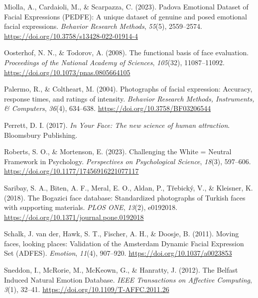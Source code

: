 \documentclass[
  letterpaper,
  DIV=11,
  numbers=noendperiod]{scrartcl}
\newlength{\cslhangindent}
\newenvironment{CSLReferences}[2] %
 {\begin{list}{}{%
  \setlength{\itemindent}{0pt}
  \setlength{\leftmargin}{0pt}
  \setlength{\parsep}{0pt}
  \ifodd #1
   \setlength{\leftmargin}{\cslhangindent}
   \setlength{\itemindent}{-1\cslhangindent}
  \fi
  \setlength{\itemsep}{#2\baselineskip}}}
 {\end{list}}
\begin{document}
\begin{CSLReferences}{1}{0}
Miolla, A., Cardaioli, M., \& Scarpazza, C. (2023). Padova {Emotional}
{Dataset} of {Facial} {Expressions} ({PEDFE}): {A} unique dataset of
genuine and posed emotional facial expressions. \emph{Behavior Research
Methods}, \emph{55}(5), 2559--2574.
\url{https://doi.org/10.3758/s13428-022-01914-4}

Oosterhof, N. N., \& Todorov, A. (2008). The functional basis of face
evaluation. \emph{Proceedings of the National Academy of Sciences},
\emph{105}(32), 11087--11092.
\url{https://doi.org/10.1073/pnas.0805664105}

Palermo, R., \& Coltheart, M. (2004). Photographs of facial expression:
{Accuracy}, response times, and ratings of intensity. \emph{Behavior
Research Methods, Instruments, \& Computers}, \emph{36}(4), 634--638.
\url{https://doi.org/10.3758/BF03206544}

Perrett, D. I. (2017). \emph{In {Your} {Face}: {The} new science of
human attraction}. Bloomsbury Publishing.

Roberts, S. O., \& Mortenson, E. (2023). Challenging the {White} =
{Neutral} {Framework} in {Psychology}. \emph{Perspectives on
Psychological Science}, \emph{18}(3), 597--606.
\url{https://doi.org/10.1177/17456916221077117}

Saribay, S. A., Biten, A. F., Meral, E. O., Aldan, P., Třebický, V., \&
Kleisner, K. (2018). The {Bogazici} face database: {Standardized}
photographs of {Turkish} faces with supporting materials. \emph{PLOS
ONE}, \emph{13}(2), e0192018.
\url{https://doi.org/10.1371/journal.pone.0192018}

Schalk, J. van der, Hawk, S. T., Fischer, A. H., \& Doosje, B. (2011).
Moving faces, looking places: {Validation} of the {Amsterdam} {Dynamic}
{Facial} {Expression} {Set} ({ADFES}). \emph{Emotion}, \emph{11}(4),
907--920. \url{https://doi.org/10.1037/a0023853}

Sneddon, I., McRorie, M., McKeown, G., \& Hanratty, J. (2012). The
{Belfast} {Induced} {Natural} {Emotion} {Database}. \emph{IEEE
Transactions on Affective Computing}, \emph{3}(1), 32--41.
\url{https://doi.org/10.1109/T-AFFC.2011.26}


\end{CSLReferences}
\end{document}
